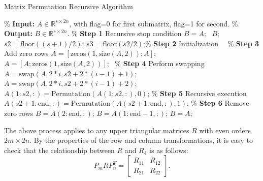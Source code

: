 \documentclass[3p]{elsarticle}
\numberwithin{equation}{section}
\begin{document}
\newpage
\begin{algorithm}[H]
    \caption{Matrix Permutation Recursive Algorithm} \label{alg:Permutation}
    \begin{algorithmic}[1]
        \State \% \textbf{Input:} $A \in \mathbb{R}^{s \times 2n}$, with flag=0 for first submatrix, flag=1 for second.
        \State \% \textbf{Output:} $B \in \mathbb{R}^{s \times 2n}$.
         \qquad\qquad\qquad\qquad\qquad\qquad\qquad\qquad\qquad\qquad\qquad \% \textbf{Step 1} Recursive stop condition
            \State $B=A$; \Return \ $B$;
        \End 
        \State $s2 = \text{floor}((s+1)/2)$; $s3 = \text{floor}(s2/2)$;\qquad\qquad\qquad\qquad\quad\% \textbf{Step 2} Initialization
         \qquad\qquad\qquad\qquad\qquad\qquad\qquad\qquad\qquad\ \ \% \textbf{Step 3} Add zero rows
                \State $A = [\text{zeros}(1, \text{size}(A, 2)); A]$;
            \Else
                \State $A = [A; \text{zeros}(1, \text{size}(A, 2))]$;
            \End
        \End
         \qquad\qquad\qquad\qquad\qquad\qquad\qquad\qquad\qquad\qquad\ \% \textbf{Step 4} Perform swapping
                \State $A= \text{swap}(A,2*i,s2+2*(i-1)+1)$;
            \Else
                \State $A= \text{swap}(A,2*i,s2+2*(i-1)+2)$;
            \End
        \End
        \State $A(1:s2, :) = \text{Permutation}(A(1:s2, :), 0)$; \qquad\qquad\qquad\qquad\% \textbf{Step 5} Recursive execution
        \State $A(s2+1:\text{end}, :) = \text{Permutation}(A(s2+1:\text{end}, :), 1)$;
         \qquad\qquad\qquad\qquad\qquad\qquad\qquad\qquad\qquad\quad \% \textbf{Step 6} Remove zero rows
                \State $B = A(2:\text{end}, :)$;
            \Else
                \State $B = A(1:\text{end}-1, :)$;
            \End
        \Else
            \State $B=A$;
        \End
    \End 
    \end{algorithmic}
\end{algorithm}

The above process applies to any upper triangular matrices $R$ with even orders $2m \times 2n$. By the properties of the row and column transformations, it is easy to check that the relationship between $R$ and $R_4$ is as follows:
\begin{equation}\label{eq:Rn}
    P_{m} R P_{n}^T = \begin{bmatrix} R_{11} & R_{12}\\R_{21}& R_{22}\end{bmatrix}.
\end{equation}
\end{document}
